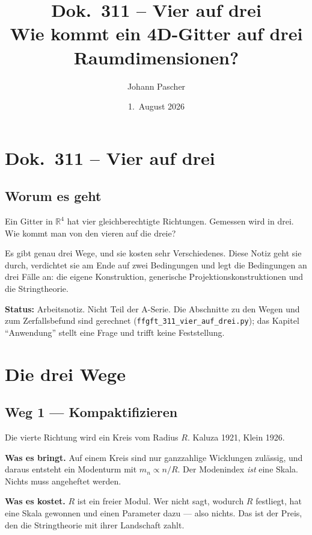 \documentclass[11pt]{report}
\title{Dok.~311 -- Vier auf drei\\
\large Wie kommt ein 4D-Gitter auf drei Raumdimensionen?}
\author{Johann Pascher}
\date{1.~August 2026}
\begin{document}
\maketitle
\tableofcontents

\chapter*{Dok.~311 -- Vier auf drei}

\section*{Worum es geht}

Ein Gitter in $\mathbb{R}^4$ hat vier gleichberechtigte Richtungen.
Gemessen wird in drei. Wie kommt man von den vieren auf die dreie?

Es gibt genau drei Wege, und sie kosten sehr Verschiedenes. Diese Notiz
geht sie durch, verdichtet sie am Ende auf zwei Bedingungen und legt die
Bedingungen an drei Fälle an: die eigene Konstruktion, generische
Projektionskonstruktionen und die Stringtheorie.

\medskip
\noindent\textbf{Status:} Arbeitsnotiz. Nicht Teil der A-Serie.
Die Abschnitte zu den Wegen und zum Zerfallsbefund sind gerechnet
(\texttt{ffgft\_311\_vier\_auf\_drei.py}); das Kapitel
\enquote{Anwendung} stellt eine Frage und trifft keine Feststellung.

\chapter{Die drei Wege}

\section{Weg 1 --- Kompaktifizieren}

Die vierte Richtung wird ein Kreis vom Radius $R$. Kaluza 1921,
Klein 1926.

\textbf{Was es bringt.} Auf einem Kreis sind nur ganzzahlige Wicklungen
zulässig, und daraus entsteht ein Modenturm mit $m_n \propto n/R$. Der
Modenindex \emph{ist} eine Skala. Nichts muss angeheftet werden.

\textbf{Was es kostet.} $R$ ist ein freier Modul. Wer nicht sagt,
wodurch $R$ festliegt, hat eine Skala gewonnen und einen Parameter dazu
--- also nichts. Das ist der Preis, den die Stringtheorie mit ihrer
Landschaft zahlt.
\end{document}
